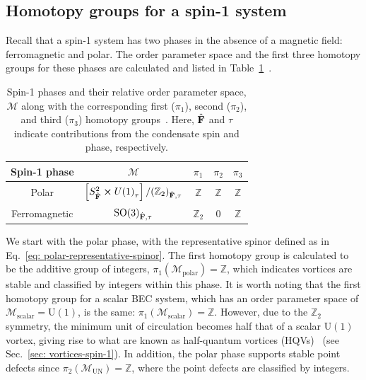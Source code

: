 \subsection{Homotopy groups for a spin-1 system}
Recall that a spin-1 system has two phases in the absence of a magnetic field:
ferromagnetic and polar.
The order parameter space and the first three homotopy groups for these phases
are calculated and listed in
Table~\ref{tab: spin-1-homotopy-groups}~\cite{Mermin1979,Kawaguchi2012,
Kobayashi2012}.
\begin{table}
    \centering
    \begin{tabular}{ccccc}
        \toprule
        Spin-1 phase & \(\mathcal{M}\) & \(\pi_1\) & \(\pi_2\) & \(\pi_3\) \\
        \midrule
        Polar & \(\left[S^2_{\hat{\vb{F}}} \cross {U(1)}_\tau\right]
        / {({\mathbb{Z}}_2)}_{\hat{\vb{F}}, \tau} \)
        & \(\mathbb{Z}\) & \(\mathbb{Z}\)  & \(\mathbb{Z}\) \\
        Ferromagnetic & \({\text{SO}(3)}_{\hat{\vb{F}}, \tau}\)
        & \({\mathbb{Z}}_2\) & 0  & \(\mathbb{Z}\) \\
        \bottomrule
    \end{tabular}
    \caption[Order parameter spaces and first three homotopy groups for spin-1
    BECs]{\label{tab: spin-1-homotopy-groups}Spin-1 phases and their relative
    order parameter space, \(\mathcal{M}\) along with the corresponding first
    (\(\pi_1\)), second (\(\pi_2\)), and third (\(\pi_3\)) homotopy
    groups~\cite{Kobayashi2012}.
    Here, \(\hat{\vb{F}}\) and \(\tau \) indicate contributions from the
    condensate spin and phase, respectively.}
\end{table}

We start with the polar phase, with the representative spinor defined as in
Eq.~\eqref{eq: polar-representative-spinor}.
The first homotopy group is calculated to be the additive group of integers,
\(\pi_1(\mathcal{M}_\text{polar}) = \mathbb{Z}\), which indicates vortices are
stable and classified by integers within this phase.
It is worth noting that the first homotopy group for a scalar BEC system,
which has an order parameter space of \(\mathcal{M}_\text{scalar}
= \text{U}(1)\), is the same: \(\pi_1(\mathcal{M}_\text{scalar}) = \mathbb{Z}\).
However, due to the \({\mathbb{Z}}_2\) symmetry, the minimum unit of circulation
becomes half that of a scalar \(\text{U}(1)\) vortex, giving rise to what are
known as half-quantum vortices (HQVs)~\cite{Kawaguchi2012} (see
Sec.~\ref{sec: vortices-spin-1}).
In addition, the polar phase supports stable point defects since
\(\pi_2(\mathcal{M}_\text{UN}) = \mathbb{Z}\), where the point defects are
classified by integers.

